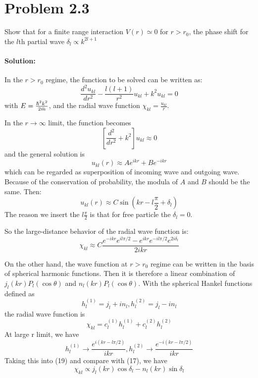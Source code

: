 \section*{Problem 2.3}
Show that for a finite range interaction $V(r) \simeq 0$ for $r>r_0$, the phase shift for the $l$th partial wave $\delta_l \propto k^{2l+1}$
\paragraph{Solution:} 
In the $r>r_0$ regime, the function to be solved can be written as: 
\begin{equation}
    \frac{d^{2} u_{kl}}{dr^2} - \frac{l(l+1)}{r^2} u_{kl} + k^2 u_{kl} = 0
\end{equation}
with $E = \frac{\hbar^2k^2}{2\Bar{m}}$, and the radial wave function $\chi_{kl} = \frac{u_{kl} }{r}$.

In the $r\to\infty$ limit, the function becomes 
\begin{equation}
    \left[\frac{d^{2}}{dr^2} + k^2\right] u_{kl} \approx 0
\end{equation}
and the general solution is
\begin{equation}
    u_{kl}(r) \approx A e^{ikr} + B e^{-ikr}
\end{equation}
which can be regarded as superposition of incoming wave and outgoing wave. Because of the conservation of probability, the modula of $A$ and $B$ should be the same. Then:
\begin{equation}
    u_{kl}(r) \approx C \sin \left(kr-l\frac{\pi}{2}+\delta_l\right)
\end{equation}
The reason we insert the $l\frac{\pi}{2}$ is that for free particle the $\delta_l=0$.

So the large-distance behavior of the radial wave function is:
\begin{equation}
    \chi_{kl} \approx C\frac{e^{-ikr}e^{il\pi/2}-e^{ikr}e^{-il\pi/2}e^{2i\delta_l}}{2ikr}
\end{equation}

On the other hand, the wave function at $r>r_0$ regime can be written in the basis of spherical harmonic functions. Then it is therefore a linear combination of $j_l(kr)P_l(\cos\theta)$ and $n_l(kr)P_l(\cos\theta)$. With the spherical Hankel functions defined as
\begin{equation}
    h_l^{(1)} = j_l +in_l, h_l^{(2)} = j_l-in_l
\end{equation}
the radial wave function is 
\begin{equation}
    \chi_{kl} = c_l^{(1)}h_l^{(1)} +c_l^{(2)}h_l^{(2)}
\end{equation}
At large r limit, we have
\begin{equation}
    h_l^{(1)} \to \frac{e^{i\left(kr-l\pi/2\right)}}{ikr}, h_l^{(2)} \to \frac{e^{-i\left(kr-l\pi/2\right)}}{ikr}
\end{equation}
Taking this into (19) and compare with (17), we have 
\begin{equation}
    \chi_{kl} \propto j_l(kr)\cos\delta_l - n_l(kr)\sin\delta_l
\end{equation}

